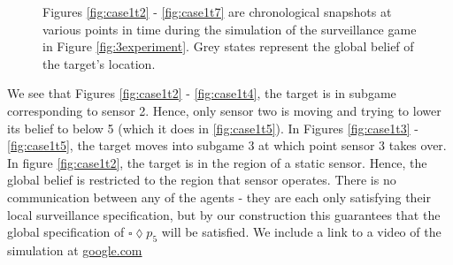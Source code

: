 \begin{figure}
\begin{minipage}{5.0cm}
{		}
		
	\end{minipage}
	
	
	\caption{Figures \ref{fig:case1t2} - \ref{fig:case1t7} are chronological snapshots at various points in time during the simulation of the surveillance game in Figure \ref{fig:3experiment}. Grey states represent the global belief of the target's location.  
	}
	\label{fig:case1exp}
	
\end{figure}

 We see that Figures \ref{fig:case1t2} - \ref{fig:case1t4}, the target is in subgame corresponding to sensor 2. Hence, only sensor two is moving and trying to lower its belief to below 5 (which it does in \ref{fig:case1t5}). In Figures \ref{fig:case1t3} - \ref{fig:case1t5}, the target moves into subgame 3 at which point sensor 3 takes over. In figure \ref{fig:case1t2}, the target is in the region of a static sensor. Hence, the global belief is restricted to the region that sensor operates. There is no communication between any of the agents - they are each only satisfying their local surveillance specification, but by our construction this guarantees that the global specification of $\square \lozenge p_5$ will be satisfied. We include a link to a video of the simulation at \url{google.com}